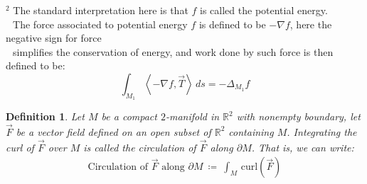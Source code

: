 \documentclass[11pt,oneside]{book}
\theoremstyle{break}
\theoremstyle{break}
\newtheorem{defn}{Definition}[corL]
\newcommand{\R}{\mathbb{R}}
\newcommand{\pd}{\partial}
\begin{document}
${}^2$ The standard interpretation here is that $f$ is called the potential energy.\\ 
${}\ \,$ The force associated to potential energy $f$ is defined to be $-\nabla f$, here the negative sign for force \\${}\ \,$ simplifies the conservation of energy, and work done by such force is then defined to be:
$$\int_{M_1} \left<-\nabla f, \vec{T} \right>\, ds = -\Delta_{M_1} f$$

\begin{defn}
Let $M$ be a compact $2$-manifold in $\R^2$ with nonempty boundary, let $\vec{F}$ be a vector field defined on an open subset of $\R^2$ containing $M$. Integrating the curl of $\vec{F}$ over $M$ is called the circulation of $\vec{F}$ along $\pd M$. That is, we can write:
\begin{align*}
\text{Circulation of }\vec{F}\text{ along }\pd M \ \coloneqq \ \int_M \, \text{curl}(\vec{F})
\end{align*}
\end{defn}
\end{document}
